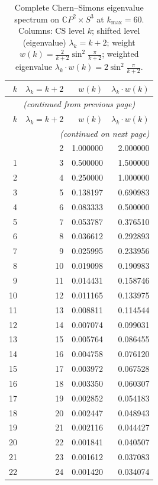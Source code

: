 \documentclass[12pt,a4paper]{article}
\begin{document}
\begin{longtable}{rrrr}
\caption{Complete Chern--Simons eigenvalue spectrum on
$\mathbb{C}P^2 \times S^3$ at $k_{\max} = 60$.
Columns: CS level $k$; shifted level (eigenvalue)
$\lambda_k = k+2$; weight $w(k) = \frac{2}{k+2}\sin^2\frac{\pi}{k+2}$;
weighted eigenvalue $\lambda_k \cdot w(k) = 2\sin^2\frac{\pi}{k+2}$.}
\label{tab:spectrum}\\
\toprule
$k$ & $\lambda_k = k{+}2$ & $w(k)$ & $\lambda_k \cdot w(k)$ \\
\midrule
\endfirsthead
\multicolumn{4}{c}{\textit{(continued from previous page)}}\\
\toprule
$k$ & $\lambda_k = k{+}2$ & $w(k)$ & $\lambda_k \cdot w(k)$ \\
\midrule
\endhead
\midrule
\multicolumn{4}{r}{\textit{(continued on next page)}}\\
\endfoot
\bottomrule
\endlastfoot
 0 &  2 & 1.000000 & 2.000000 \\
 1 &  3 & 0.500000 & 1.500000 \\
 2 &  4 & 0.250000 & 1.000000 \\
 3 &  5 & 0.138197 & 0.690983 \\
 4 &  6 & 0.083333 & 0.500000 \\
 5 &  7 & 0.053787 & 0.376510 \\
 6 &  8 & 0.036612 & 0.292893 \\
 7 &  9 & 0.025995 & 0.233956 \\
 8 & 10 & 0.019098 & 0.190983 \\
 9 & 11 & 0.014431 & 0.158746 \\
10 & 12 & 0.011165 & 0.133975 \\
11 & 13 & 0.008811 & 0.114544 \\
12 & 14 & 0.007074 & 0.099031 \\
13 & 15 & 0.005764 & 0.086455 \\
14 & 16 & 0.004758 & 0.076120 \\
15 & 17 & 0.003972 & 0.067528 \\
16 & 18 & 0.003350 & 0.060307 \\
17 & 19 & 0.002852 & 0.054183 \\
18 & 20 & 0.002447 & 0.048943 \\
19 & 21 & 0.002116 & 0.044427 \\
20 & 22 & 0.001841 & 0.040507 \\
21 & 23 & 0.001612 & 0.037083 \\
22 & 24 & 0.001420 & 0.034074 \\

\end{longtable}
\end{document}

